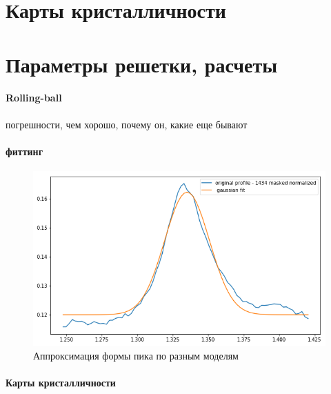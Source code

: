 	\section{Карты кристалличности}
	
	\section{Параметры решетки, расчеты}
	
	
	\paragraph{Rolling-ball}
	погрешности, чем хорошо, почему он, какие еще бывают
	


    \paragraph{фиттинг}

\begin{figure}
    \centering
    \includegraphics[width=\linewidth]{fig/gauss-fit.png}
    \caption{Аппроксимация формы пика по разным моделям}
    \label{fig:my_label}
\end{figure}
	
	\paragraph{Карты кристалличности}
	
